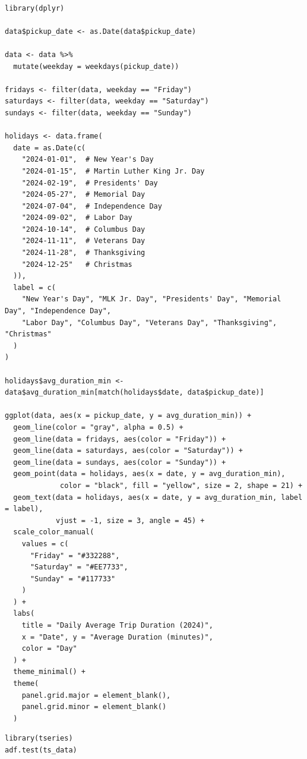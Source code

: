 \documentclass{article}
\begin{document}
\begin{lstlisting}[style=rstyle, caption={Plot Highlighting Weekends and Holidays}, label={lst:r_plot_weekend_holidays}]

library(dplyr)

data$pickup_date <- as.Date(data$pickup_date)

data <- data %>%
  mutate(weekday = weekdays(pickup_date))

fridays <- filter(data, weekday == "Friday")
saturdays <- filter(data, weekday == "Saturday")
sundays <- filter(data, weekday == "Sunday")

holidays <- data.frame(
  date = as.Date(c(
    "2024-01-01",  # New Year's Day
    "2024-01-15",  # Martin Luther King Jr. Day
    "2024-02-19",  # Presidents' Day
    "2024-05-27",  # Memorial Day
    "2024-07-04",  # Independence Day
    "2024-09-02",  # Labor Day
    "2024-10-14",  # Columbus Day
    "2024-11-11",  # Veterans Day
    "2024-11-28",  # Thanksgiving
    "2024-12-25"   # Christmas
  )),
  label = c(
    "New Year's Day", "MLK Jr. Day", "Presidents' Day", "Memorial Day", "Independence Day",
    "Labor Day", "Columbus Day", "Veterans Day", "Thanksgiving", "Christmas"
  )
)

holidays$avg_duration_min <- data$avg_duration_min[match(holidays$date, data$pickup_date)]

ggplot(data, aes(x = pickup_date, y = avg_duration_min)) +
  geom_line(color = "gray", alpha = 0.5) +
  geom_line(data = fridays, aes(color = "Friday")) +
  geom_line(data = saturdays, aes(color = "Saturday")) +
  geom_line(data = sundays, aes(color = "Sunday")) +
  geom_point(data = holidays, aes(x = date, y = avg_duration_min), 
             color = "black", fill = "yellow", size = 2, shape = 21) +
  geom_text(data = holidays, aes(x = date, y = avg_duration_min, label = label), 
            vjust = -1, size = 3, angle = 45) +
  scale_color_manual(
    values = c(
      "Friday" = "#332288", 
      "Saturday" = "#EE7733",
      "Sunday" = "#117733"   
    )
  ) +
  labs(
    title = "Daily Average Trip Duration (2024)",
    x = "Date", y = "Average Duration (minutes)",
    color = "Day"
  ) +
  theme_minimal() +
  theme(
    panel.grid.major = element_blank(),
    panel.grid.minor = element_blank()
  )

\end{lstlisting}

\begin{lstlisting}[style=rstyle, caption={ Augmented Dickey-Fuller (ADF) Test}, label={lst:r_adf_test}]
library(tseries)
adf.test(ts_data)
\end{lstlisting}
\end{document}
